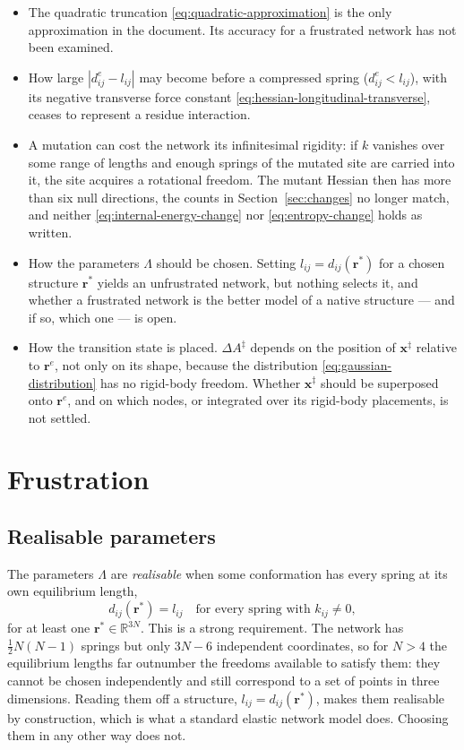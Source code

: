 \documentclass[11pt]{article}
\newcommand{\rr}{\mathbf{r}}
\newcommand{\LL}{\Lambda}
\newcommand{\re}{\rr^{e}}
\newcommand{\dije}{d^{e}_{ij}}
\newcommand{\lij}{l_{ij}}
\newcommand{\kij}{k_{ij}}
\newcommand{\dij}{d_{ij}}
\newcommand{\xx}{\mathbf{x}}
\newcommand{\xts}{\xx^{\ddagger}}
\begin{document}
\begin{itemize}
\item The quadratic truncation \eqref{eq:quadratic-approximation} is the only approximation in
the document. Its accuracy for a frustrated network has not been examined.
\item How large $|\dije - \lij|$ may become before a compressed spring
($\dije < \lij$), with its negative transverse force constant
\eqref{eq:hessian-longitudinal-transverse}, ceases to represent a residue
interaction.
\item A mutation can cost the network its infinitesimal rigidity: if $k$ vanishes
over some range of lengths and enough springs of the mutated site are carried into
it, the site acquires a rotational freedom. The mutant Hessian then has more than
six null directions, the counts in Section~\ref{sec:changes} no longer match, and
neither \eqref{eq:internal-energy-change} nor \eqref{eq:entropy-change} holds as
written.
\item How the parameters $\LL$ should be chosen. Setting
$\lij = \dij(\rr^{\ast})$ for a chosen structure $\rr^{\ast}$ yields an
unfrustrated network, but nothing selects it, and whether a frustrated network is
the better model of a native structure --- and if so, which one --- is open.
\item How the transition state is placed. $\Delta A^{\ddagger}$ depends on the
position of $\xts$ relative to $\re$, not only on its shape, because the distribution
\eqref{eq:gaussian-distribution} has no rigid-body freedom. Whether $\xts$ should be
superposed onto $\re$, and on which nodes, or integrated over its rigid-body
placements, is not settled.
\end{itemize}

\section{Frustration}
\label{app:frustration}

\subsection*{Realisable parameters}

The parameters $\LL$ are \emph{realisable} when some conformation has every spring at its own equilibrium length,
\begin{equation}
\dij(\rr^{\ast}) = \lij \quad \text{for every spring with } \kij \ne 0 ,
\label{eq:realisable}
\end{equation}
for at least one $\rr^{\ast} \in \mathbb{R}^{3N}$.
This is a strong requirement.
The network has $\tfrac12 N(N-1)$ springs but only $3N-6$ independent coordinates, so for $N > 4$ the equilibrium lengths far outnumber the freedoms available to satisfy them: they cannot be chosen independently and still correspond to a set of points in three dimensions.
Reading them off a structure, $\lij = \dij(\rr^{\ast})$, makes them realisable by construction, which is what a standard elastic network model does.
Choosing them in any other way does not.
\end{document}
